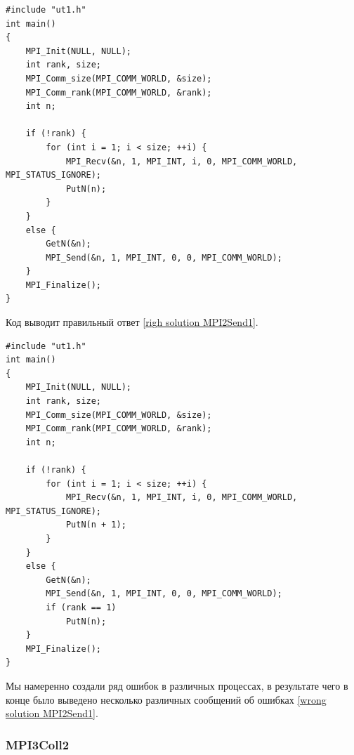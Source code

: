 \lstset{language=c++}
\begin{lstlisting}
#include "ut1.h"
int main()
{
    MPI_Init(NULL, NULL);
    int rank, size;
    MPI_Comm_size(MPI_COMM_WORLD, &size);
    MPI_Comm_rank(MPI_COMM_WORLD, &rank);
    int n;

    if (!rank) {
        for (int i = 1; i < size; ++i) {
            MPI_Recv(&n, 1, MPI_INT, i, 0, MPI_COMM_WORLD, MPI_STATUS_IGNORE);
            PutN(n);
        }
    }
    else {
        GetN(&n);
        MPI_Send(&n, 1, MPI_INT, 0, 0, MPI_COMM_WORLD);
    }
	MPI_Finalize();
}
\end{lstlisting}

Код выводит правильный ответ \ref{righ solution MPI2Send1}.

\lstset{language=c++}
\begin{lstlisting}
#include "ut1.h"
int main()
{
    MPI_Init(NULL, NULL);
    int rank, size;
    MPI_Comm_size(MPI_COMM_WORLD, &size);
    MPI_Comm_rank(MPI_COMM_WORLD, &rank);
    int n;

    if (!rank) {
        for (int i = 1; i < size; ++i) {
            MPI_Recv(&n, 1, MPI_INT, i, 0, MPI_COMM_WORLD, MPI_STATUS_IGNORE);
            PutN(n + 1);
        }
    }
    else {
        GetN(&n);
        MPI_Send(&n, 1, MPI_INT, 0, 0, MPI_COMM_WORLD);
        if (rank == 1)
            PutN(n);
    }
	MPI_Finalize();
}
\end{lstlisting}

Мы намеренно создали ряд ошибок в различных процессах, в результате чего в конце было выведено несколько различных сообщений об ошибках \ref{wrong solution MPI2Send1}.

\newpage

\subsubsection{MPI3Coll2}

